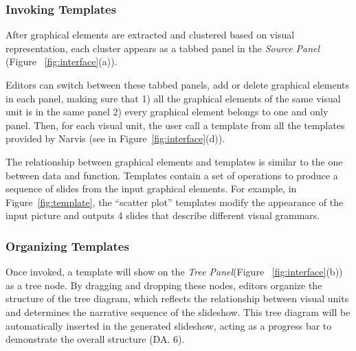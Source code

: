 \subsubsection{Invoking Templates} 

After graphical elements are extracted and clustered based on visual representation, each cluster appears as a tabbed panel in the \textit{Source Panel} (Figure ~\ref{fig:interface}(a)). 

Editors can switch between these tabbed panels, add or delete graphical elements in each panel, making sure that 1) all the graphical elements of the same visual unit is in the same panel 2) every graphical element belongs to one and only panel. Then, for each visual unit, the user call a template from all the templates provided by Narvis (see in Figure~\ref{fig:interface}(d)). 

The relationship between graphical elements and templates is similar to the one between data and function. Templates contain a set of operations to produce a sequence of slides from the input graphical elements. For example, in Figure~\ref{fig:template}, the ``scatter plot'' templates modify the appearance of the input picture and outputs 4 slides that describe different visual grammars. 

\subsubsection{Organizing Templates} 
Once invoked, a template will show on the \textit{Tree Panel}(Figure ~\ref{fig:interface}(b)) as a tree node. 
By dragging and dropping these nodes, editors organize the structure of the tree diagram, which reflects the relationship between visual units and determines the narrative sequence of the slideshow. This tree diagram will be automatically inserted in the generated slideshow, acting as a progress bar to demonstrate the overall structure (DA. 6). 

